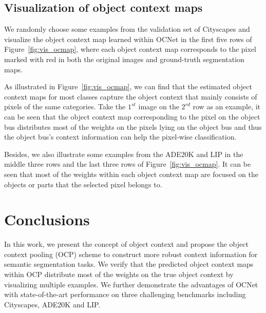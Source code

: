 \documentclass[10pt,twocolumn,letterpaper]{article}
\begin{document}
\subsection{Visualization of object context maps}
We randomly choose some examples from the validation set of Cityscapes
and visualize the object context map learned within OCNet in
the first five rows of Figure~\ref{fig:vis_ocmap},
where each object context map corresponds to the pixel marked with red {}
in both the original images and ground-truth segmentation maps.

As illustrated in Figure~\ref{fig:vis_ocmap},
we can find that the estimated object context maps
for most classes capture the object context
that mainly consists of pixels of the same categories.
Take the $1^{st}$ image on the $2^{rd}$ row as an example, it can be seen that
the object context map corresponding to the pixel on the object bus
distributes most of the weights on the pixels lying
on the object bus and thus the object bus's context information
can help the pixel-wise classification.

Besides, we also illustrate some examples from the ADE20K and LIP
in the middle three rows and the last three rows of Figure~\ref{fig:vis_ocmap}.
It can be seen that most of the weights within each object context map are focused on the
objects or parts that the selected pixel belongs to.








\section{Conclusions}

In this work,
we present the concept of object context
and propose the object context pooling (OCP) scheme
to construct more robust context information for semantic segmentation tasks.
We verify that the predicted object context maps
within OCP distribute most of the weights on the true object context
by visualizing multiple examples.
We further demonstrate the advantages of OCNet
with state-of-the-art performance on three challenging benchmarks
including Cityscapes, ADE20K and LIP.


{\small


}
\end{document}
